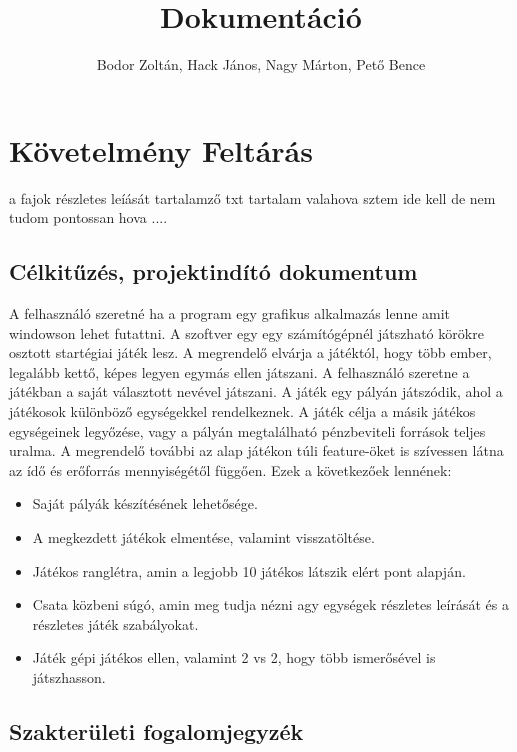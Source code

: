\documentclass[a4paper,12pt]{report}
\title{Dokumentáció}
\author{Bodor Zoltán, Hack János, Nagy Márton, Pető Bence}
\begin{document}
\maketitle

%

\tableofcontents

\chapter{Követelmény Feltárás}

a fajok részletes leíását tartalamző txt tartalam valahova sztem ide kell de nem tudom pontossan hova ....

\section{Célkitűzés, projektindító dokumentum}

A felhasználó szeretné ha a program egy grafikus alkalmazás lenne amit windowson lehet futattni. A szoftver egy egy számítógépnél játszható körökre osztott startégiai játék lesz. A megrendelő elvárja a játéktól, hogy több ember, legalább kettő, képes legyen egymás ellen játszani. A felhasználó
szeretne a játékban a saját választott nevével játszani. A játék egy pályán játszódik, ahol a játékosok különböző egységekkel rendelkeznek. A játék célja a másik játékos egységeinek legyőzése, vagy a pályán megtalálható pénzbeviteli források teljes uralma.
A megrendelő további az alap játékon túli feature-öket is szívessen látna az ídő és erőforrás mennyiségétől függően. Ezek a következőek lennének:
\begin{itemize}
\item Saját pályák készítésének lehetősége.
\item A megkezdett játékok elmentése, valamint visszatöltése.
\item Játékos ranglétra, amin a legjobb 10 játékos látszik elért pont alapján.
\item Csata közbeni súgó, amin meg tudja nézni agy egységek részletes leírását és a részletes játék szabályokat.
\item Játék gépi játékos ellen, valamint 2 vs 2, hogy több ismerősével is játszhasson.
\end{itemize} 

\section{Szakterületi fogalomjegyzék}
\end{document}
